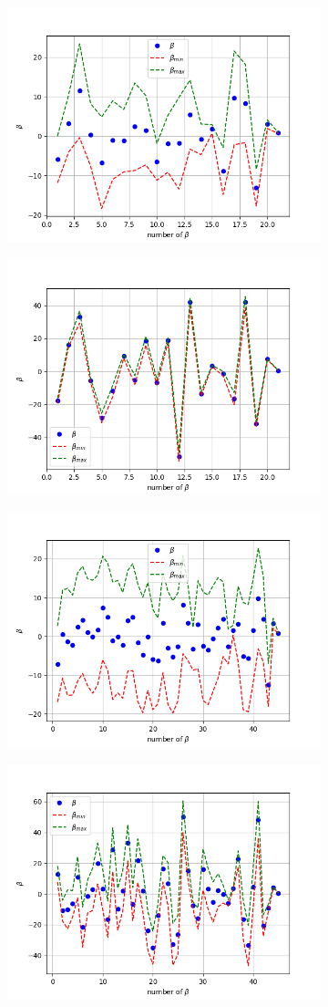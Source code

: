 \begin{figure}[!ht]
\begin{subfigure}{\textwidth}
\end{subfigure}
\begin{subfigure}{\textwidth}
  \centering
\includegraphics[width=0.5\linewidth]{images/betas/fake_ridge_beta_p05_n10.png}
\end{subfigure}
\begin{subfigure}{\textwidth}
  \centering
\includegraphics[width=0.5\linewidth]{images/betas/fake_ridge_beta_p05_n100.png}
\end{subfigure}
\begin{subfigure}{\textwidth}
  \centering
\includegraphics[width=0.5\linewidth]{images/betas/fake_ridge_beta_p08_n10.png}
\end{subfigure}
\begin{subfigure}{\textwidth}
  \centering
\includegraphics[width=0.5\linewidth]{images/betas/fake_ridge_beta_p08_n100.png}

\end{subfigure}
\end{figure}
